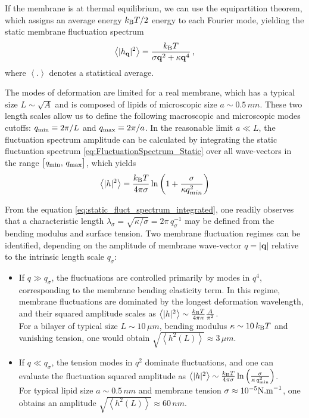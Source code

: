 \documentclass[graybox]{svmult}
\begin{document}
	  If the membrane is at thermal equilibrium, we can use the equipartition theorem, which assigns an average energy $k_{\rm{B}}T/2$ energy to each Fourier mode, yielding the static membrane fluctuation spectrum
\begin{equation}
	\label{eq:FluctuationSpectrum_Static}
	\left\langle |h_{\mathbf{q}}|^2\right\rangle = \frac{k_{\rm{B}}T}{\sigma \mathbf{q}^2 + \kappa \mathbf{q}^4}
	\,\textrm{,}
\end{equation}
where $\left\langle.\right\rangle$ denotes a statistical average.

The modes of deformation are limited for a real membrane, which has a typical size $L \sim \sqrt{A}$ and is composed of lipids of microscopic size $a\sim 0.5\,nm$. These two length scales allow us to define the following macroscopic and microscopic modes cutoffs: $q_{\rm{min}}\equiv 2\pi/L$ and $q_{\rm{max}} \equiv 2\pi/a$. In the reasonable limit $a \ll L$, the fluctuation spectrum amplitude can be calculated by integrating the static fluctuation spectrum \eqref{eq:FluctuationSpectrum_Static} over all wave-vectors in the range $\big[q_{\rm{min}}, \,q_{\rm{max}}\big]$, which yields
\begin{equation}
\left\langle |h|^2 \right\rangle = \frac{k_{\rm{B}}T}{4\pi\sigma}\ln\left(1+\frac{\sigma}{\kappa q_{min}^2}\right)
\label{eq:static_fluct_spectrum_integrated}
\end{equation}

From the equation \eqref{eq:static_fluct_spectrum_integrated}, one readily observes that a characteristic length $\lambda_{\sigma} = \sqrt{\kappa/\sigma} = 2\pi\,q_{\sigma}^{-1}$ may be defined from the bending modulus and surface tension. Two membrane fluctuation regimes can be identified, depending on the amplitude of membrane wave-vector $q = |\mathbf{q}|$ relative to the intrinsic length scale $q_{\sigma}$:

	\begin{itemize}
	\item If $q \gg q_{\sigma}$, the fluctuations are controlled primarily by modes in $q^4$, corresponding to the membrane bending elasticity term. In this regime, membrane fluctuations are dominated by the longest deformation wavelength, and their squared amplitude scales as $\left\langle |h|^2 \right\rangle \sim \frac{k_{\rm{B}}T}{4\pi\kappa}\frac{A}{\pi^2}$. 
	\\
	For a bilayer of typical size $L \sim 10\,\mu m$, bending modulus $\kappa \sim 10\,k_{\rm{B}}T$ and vanishing tension, one would obtain $\sqrt{\left\langle h^2(L) \right\rangle}\approx 3\,\mu m$. 
	\\
	\item If $q \ll q_{\sigma}$, the tension modes in $q^2$ dominate fluctuations, and one can evaluate the fluctuation squared amplitude as $\left\langle |h|^2 \right\rangle \sim \frac{k_{\rm{B}}T}{4\pi\sigma}\ln\left(\frac{\sigma}{\kappa\,q_{\rm{min}}^2}\right)$. 
	\\
	For typical lipid size $a\sim 0.5\,nm$ and membrane tension $\sigma \approx 10^{-5}\rm{N.m}^{-1}$, one obtains an amplitude $\sqrt{\left\langle h^2(L) \right\rangle}\approx 60\,nm $.
	\end{itemize}	
\end{document}
